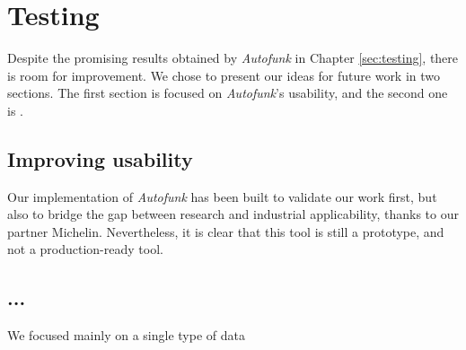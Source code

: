 \section{Testing}
\label{sec:conclusion:testing}

Despite the promising results obtained by \textit{Autofunk} in
Chapter \ref{sec:testing}, there is room for improvement. We
chose to present our ideas for future work in two sections. The
first section is focused on \textit{Autofunk}'s usability, and
the second one is .

\subsection{Improving usability}

Our implementation of \textit{Autofunk} has been built to
validate our work first, but also to bridge the gap between
research and industrial applicability, thanks to our partner
Michelin. Nevertheless, it is clear that this tool is still a
prototype, and not a production-ready tool.

\TODO{}

\subsection{...}

We focused mainly on a single type of data
